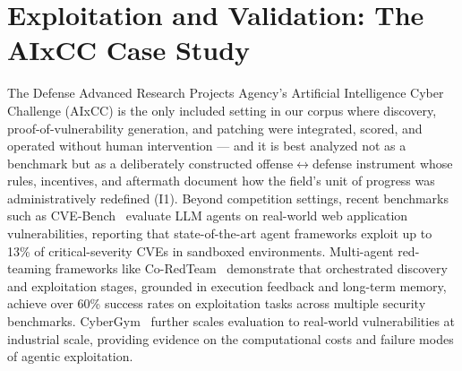 \documentclass[conference,compsoc]{IEEEtran}
\begin{document}
\begin{table}[t]
\centering\scriptsize
\caption{Discovery-side comparison across autonomy levels. E-class per protocol v4;
validity flags use the V1--V5 taxonomy of Sec.~\ref{sec:validity}. Operational statistics are
source-reported; their provenance varies across vendor disclosures, research reports, and
controlled experiments.}
\label{tab:disccompare}
\end{table}

\section{Exploitation and Validation: The AIxCC Case Study}
\label{sec:aixcc}

The Defense Advanced Research Projects Agency's Artificial Intelligence Cyber Challenge
(AIxCC) is the only included setting in our corpus where discovery, proof-of-vulnerability
generation, and patching were integrated, scored, and operated without human intervention --- and it is best
analyzed not as a benchmark but as a deliberately constructed offense$\leftrightarrow$defense
instrument whose rules, incentives, and aftermath document how the field's unit of progress was
administratively redefined (I1). Beyond competition settings, recent benchmarks such as
CVE-Bench~\cite{cvebench2025} evaluate LLM agents on real-world web application vulnerabilities,
reporting that state-of-the-art agent frameworks exploit up to 13\% of critical-severity CVEs in
sandboxed environments. Multi-agent red-teaming frameworks like Co-RedTeam~\cite{coredteam2026}
demonstrate that orchestrated discovery and exploitation stages, grounded in execution feedback
and long-term memory, achieve over 60\% success rates on exploitation tasks across multiple
security benchmarks. CyberGym~\cite{cybergym2026} further scales evaluation to real-world
vulnerabilities at industrial scale, providing evidence on the computational costs and failure
modes of agentic exploitation.
\end{document}
